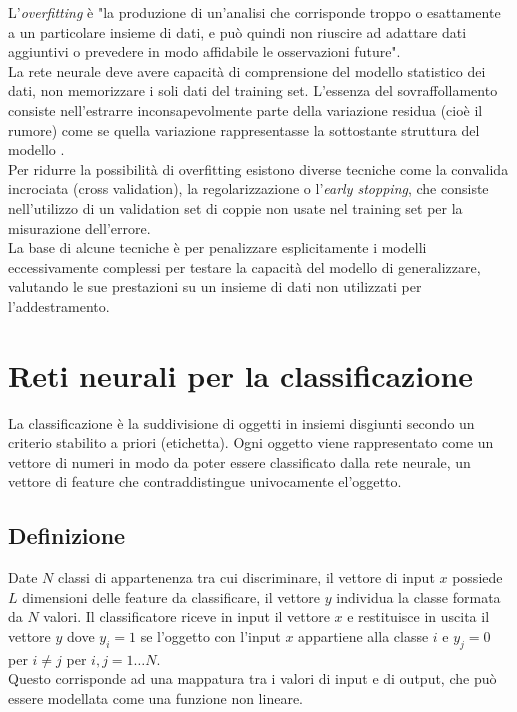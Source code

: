 L'\emph{overfitting} è "la produzione di un'analisi che corrisponde troppo o esattamente a un particolare insieme di dati, e può quindi non riuscire ad adattare dati aggiuntivi o prevedere in modo affidabile le osservazioni future".\\
La rete neurale deve avere capacità di comprensione del modello statistico dei dati, non memorizzare i soli dati del training set. L'essenza del sovraffollamento consiste nell'estrarre inconsapevolmente parte della variazione residua (cioè il rumore) come se quella variazione rappresentasse la sottostante struttura del modello \cite{burnham2003model}.\\
Per ridurre la possibilità di overfitting esistono diverse tecniche come la convalida incrociata (cross validation), la regolarizzazione o l'\emph{early stopping}, che consiste nell'utilizzo di un validation set di coppie non usate nel training set per la misurazione dell'errore.\\
La base di alcune tecniche è per penalizzare esplicitamente i modelli eccessivamente complessi per testare la capacità del modello di generalizzare, valutando le sue prestazioni su un insieme di dati non utilizzati per l'addestramento.

\section{Reti neurali per la classificazione}
\label{sec:classificazione}
La classificazione è la suddivisione di oggetti in insiemi disgiunti secondo un criterio stabilito a priori (etichetta). Ogni oggetto viene rappresentato come un vettore di numeri in modo da poter essere classificato dalla rete neurale, un vettore di feature che contraddistingue univocamente el'oggetto.\\
\subsection{Definizione}
\label{subsec:defclass}
Date $N$ classi di appartenenza tra cui discriminare, il vettore di input $x$ possiede $L$ dimensioni delle feature da classificare, il vettore $y$ individua la classe formata da $N$ valori. Il classificatore riceve in input il vettore $x$ e restituisce in uscita il vettore $y$ dove $y_i=1$ se l'oggetto con l'input $x$ appartiene alla classe $i$ e $y_j=0$ per $i\neq j$ per $i,j=1 \dots N$.\\
Questo corrisponde ad una mappatura tra i valori di input e di output, che può essere modellata come una funzione non lineare.

